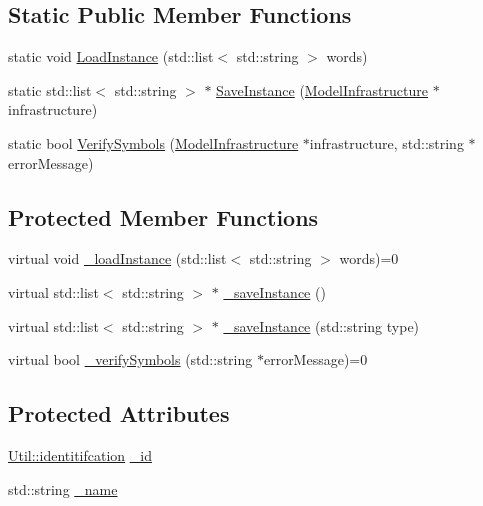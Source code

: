 \subsection*{Static Public Member Functions}
\begin{DoxyCompactItemize}
\item 
static void \hyperlink{class_model_infrastructure_a3e309d346ecc1a96c67a13f5f5f18bf4}{Load\-Instance} (std\-::list$<$ std\-::string $>$ words)
\item 
static std\-::list$<$ std\-::string $>$ $\ast$ \hyperlink{class_model_infrastructure_a4da62e3f3b294abc9e266d1dcfb830cc}{Save\-Instance} (\hyperlink{class_model_infrastructure}{Model\-Infrastructure} $\ast$infrastructure)
\item 
static bool \hyperlink{class_model_infrastructure_a8ac134e84f885300a188fcc0904f1848}{Verify\-Symbols} (\hyperlink{class_model_infrastructure}{Model\-Infrastructure} $\ast$infrastructure, std\-::string $\ast$error\-Message)
\end{DoxyCompactItemize}
\subsection*{Protected Member Functions}
\begin{DoxyCompactItemize}
\item 
virtual void \hyperlink{class_model_infrastructure_ae118c8ad2ac9d4397c40d004af51b2dc}{\-\_\-load\-Instance} (std\-::list$<$ std\-::string $>$ words)=0
\item 
virtual std\-::list$<$ std\-::string $>$ $\ast$ \hyperlink{class_model_infrastructure_a991f46601d9e865f2e27c6cd7a2b702d}{\-\_\-save\-Instance} ()
\item 
virtual std\-::list$<$ std\-::string $>$ $\ast$ \hyperlink{class_model_infrastructure_a0e03d03d3c7166e66dfddac6740c2e1b}{\-\_\-save\-Instance} (std\-::string type)
\item 
virtual bool \hyperlink{class_model_infrastructure_a43de089b35b96c32dd24ca4f9636a388}{\-\_\-verify\-Symbols} (std\-::string $\ast$error\-Message)=0
\end{DoxyCompactItemize}
\subsection*{Protected Attributes}
\begin{DoxyCompactItemize}
\item 
\hyperlink{class_util_ad17d458d9344b10bba64347e514d6d71}{Util\-::identitifcation} \hyperlink{class_model_infrastructure_af6fe00f683f5e29cbcd667e4d3bd24d0}{\-\_\-id}
\item 
std\-::string \hyperlink{class_model_infrastructure_aa73c0444ba8e3515e2aec3154eaad85d}{\-\_\-name}
\end{DoxyCompactItemize}


